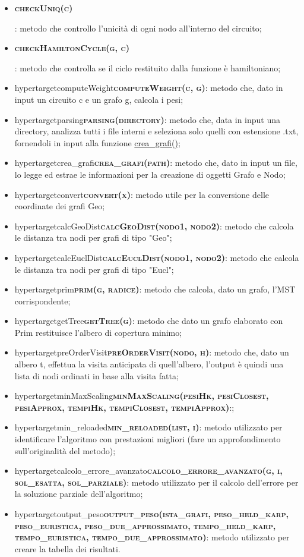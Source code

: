 \begin{itemize}
    \item \hypertarget{cehckUniq}{\textbf{\textsc{checkUniq(c)}}}: metodo che controllo l'unicità di ogni nodo all'interno del circuito;
    \item \hypertarget{checkHamiltonCycle}{\textbf{\textsc{checkHamiltonCycle(g, c)}}}: metodo che controlla se il ciclo restituito dalla funzione è hamiltoniano;
    \item hypertarget{computeWeight}{\textbf{\textsc{computeWeight(c, g)}}}: metodo che, dato in input un circuito c e un grafo g, calcola i pesi;
    \item hypertarget{parsing}{\textbf{\textsc{parsing(directory)}}}: metodo che, data in input una directory, analizza tutti i file interni e seleziona solo quelli con estensione .txt, fornendoli in input alla funzione \hyperlink{creagrafi}{crea\_grafi()};
    \item hypertarget{crea\_grafi}{\textbf{\textsc{crea\_grafi(path)}}}: metodo che, dato in input un file, lo legge ed estrae le informazioni per la creazione di oggetti Grafo e Nodo;
    \item hypertarget{convert}{\textbf{\textsc{convert(x)}}}: metodo utile per la conversione delle coordinate dei grafi Geo;
    \item hypertarget{calcGeoDist}{\textbf{\textsc{calcGeoDist(nodo1, nodo2)}}}: metodo che calcola le distanza tra nodi per grafi di tipo "Geo";
    \item hypertarget{calcEuclDist}{\textbf{\textsc{calcEuclDist(nodo1, nodo2)}}}: metodo che calcola le distanza tra nodi per grafi di tipo "Eucl";
    \item hypertarget{prim}{\textbf{\textsc{prim(g, radice)}}}: metodo che calcola, dato un grafo, l'MST corrispondente;
    \item hypertarget{getTree}{\textbf{\textsc{getTree(g)}}}: metodo che dato un grafo elaborato con Prim restituisce l'albero di copertura minimo;
    \item hypertarget{preOrderVisit}{\textbf{\textsc{preOrderVisit(nodo, h)}}}: metodo che, dato un albero t, effettua la visita anticipata di quell'albero, l'output è quindi una lista di nodi ordinati in base alla visita fatta;
    \item hypertarget{minMaxScaling}{\textbf{\textsc{minMaxScaling(pesiHk, pesiClosest, pesiApprox, tempiHk, tempiClosest, tempiApprox)}}}:;
    \item hypertarget{min\_reloaded}{\textbf{\textsc{min\_reloaded(list, i)}}}: metodo utilizzato per identificare l'algoritmo con prestazioni migliori (fare un approfondimento sull'originalità del metodo);
    \item hypertarget{calcolo\_errore\_avanzato}{\textbf{\textsc{calcolo\_errore\_avanzato(g, i, sol\_esatta, sol\_parziale)}}}: metodo utilizzato per il calcolo dell'errore per la soluzione parziale dell'algoritmo;
    \item hypertarget{output\_peso}{\textbf{\textsc{output\_peso(ista\_grafi, peso\_held\_karp, peso\_euristica, peso\_due\_approssimato, tempo\_held\_karp, tempo\_euristica, tempo\_due\_approssimato)}}}: metodo utilizzato per creare la tabella dei risultati.
\end{itemize}

